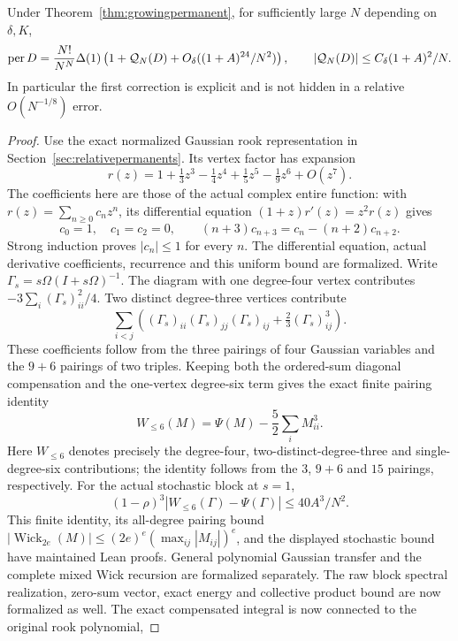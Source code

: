 \begin{theorem}
\label{thm:secondpermanent}
Under Theorem~\ref{thm:growingpermanent}, for sufficiently large
\(N\) depending on \(\delta,K\),
\[
 \operatorname{per}D
 =\frac{N!}{N^N}\Delta(1)
   \left(1+{\cal Q}_N(D)
             +O_\delta((1+A)^{24}/N^2)\right),
 \qquad |{\cal Q}_N(D)|\leq C_\delta(1+A)^2/N .
\]
In particular the first correction is explicit and is not
hidden in a relative \(O(N^{-1/8})\) error.
\end{theorem}
\begin{proof}
Use the exact normalized Gaussian rook representation in
Section~\ref{sec:relativepermanents}. Its vertex factor has
expansion
\[
 r(z)=1+\tfrac13z^3-\tfrac14z^4+\tfrac15z^5
                              -\tfrac19z^6+O(z^7).
\]
The coefficients here are those of the actual complex entire
function: with \(r(z)=\sum_{n\geq0}c_nz^n\), its differential
equation \((1+z)r'(z)=z^2r(z)\) gives
\[
 c_0=1,\quad c_1=c_2=0,\qquad
 (n+3)c_{n+3}=c_n-(n+2)c_{n+2}.
\]
Strong induction proves \(|c_n|\leq1\) for every \(n\).
The differential equation, actual derivative coefficients, recurrence
and this uniform bound are formalized.
Write \(\Gamma_s=s\Omega(I+s\Omega)^{-1}\).
The diagram with one degree-four vertex contributes
\(-3\sum_i(\Gamma_s)_{ii}^2/4\).
Two distinct degree-three vertices contribute
\[
 \sum_{i<j}
 \left((\Gamma_s)_{ii}(\Gamma_s)_{jj}(\Gamma_s)_{ij}
                              +\tfrac23(\Gamma_s)_{ij}^3\right).
\]
These coefficients follow from the three pairings of four
Gaussian variables and the \(9+6\) pairings of two triples.
Keeping both the ordered-sum diagonal compensation and the
one-vertex degree-six term gives the exact finite pairing identity
\[
 W_{\leq6}(M)=\Psi(M)-\frac52\sum_iM_{ii}^3.
\]
Here \(W_{\leq6}\) denotes precisely the degree-four,
two-distinct-degree-three and single-degree-six contributions;
the identity follows from the \(3\), \(9+6\) and \(15\)
pairings, respectively. For the actual stochastic block at \(s=1\),
\[
 (1-\rho)^3|W_{\leq6}(\Gamma)-\Psi(\Gamma)|
                  \leq40A^3/N^2.
\]
This finite identity, its all-degree pairing bound
\(|\operatorname{Wick}_{2e}(M)|\leq(2e)^e
(\max_{ij}|M_{ij}|)^e\), and the displayed stochastic bound
have maintained Lean proofs. General polynomial Gaussian transfer
and the complete mixed Wick recursion are formalized separately.
The raw block spectral realization, zero-sum vector, exact energy and
collective product bound are now formalized as well. The exact
compensated integral is now connected to the original rook polynomial,

\end{proof}

